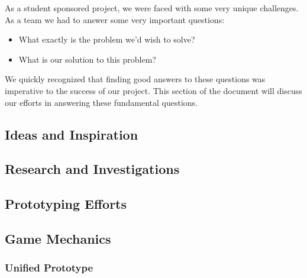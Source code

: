 As a student sponsored project, we were faced with some very unique
challenges. As a team we had to answer some very important questions: 

\begin{itemize}
    \item What exactly is the problem we'd wish to solve?
    \item What is our solution to this problem?
\end{itemize}

We quickly recognized that finding good answers to these questions was imperative to the success of our project. 
This section of the document will discuss our efforts in answering these fundamental questions.

\subsection{Ideas and Inspiration}
    
\newpage

\subsection{Research and Investigations}
  
\newpage

\subsection{Prototyping Efforts}
  
\newpage

\subsection{Game Mechanics}
\subsubsection{Unified Prototype}

\newpage